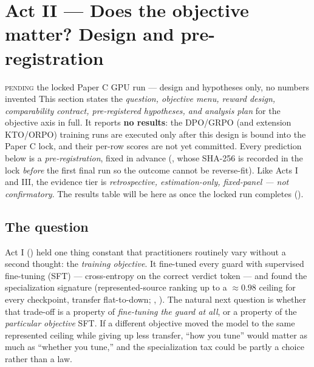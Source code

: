 \section{Act II --- Does the objective matter? Design and pre-registration}
\label{sec:actII}

\begin{pending}{\textsc{pending} the locked Paper C GPU run --- design and hypotheses only, no numbers invented}
This section states the \emph{question, objective menu, reward design, comparability contract,
pre-registered hypotheses, and analysis plan} for the objective axis in full. It reports \textbf{no
results}: the DPO/GRPO (and extension KTO/ORPO) training runs are executed only after this design is
bound into the Paper C lock, and their per-row scores are not yet committed. Every prediction below is
a \emph{pre-registration}, fixed in advance (, whose SHA-256 is recorded
in the lock \emph{before} the first final run so the outcome cannot be reverse-fit). Like Acts I and
III, the evidence tier is \emph{retrospective, estimation-only, fixed-panel --- not confirmatory}. The
results table will be  here as  once the locked run
completes ().
\end{pending}

\subsection{The question}
\label{sec:actII-q}

Act I () held one thing constant that practitioners routinely vary without a second
thought: the \emph{training objective}. It fine-tuned every guard with supervised fine-tuning (SFT) ---
cross-entropy on the correct verdict token --- and found the specialization signature (represented-source
ranking up to a $\approx\!0.98$ ceiling for every checkpoint, transfer flat-to-down; ,
). The natural next question is whether that trade-off is a property of \emph{fine-tuning
the guard at all}, or a property of the \emph{particular objective} SFT. If a different objective moved
the model to the same represented ceiling while giving up less transfer, ``how you tune'' would matter as
much as ``whether you tune,'' and the specialization tax could be partly a choice rather than a law.

